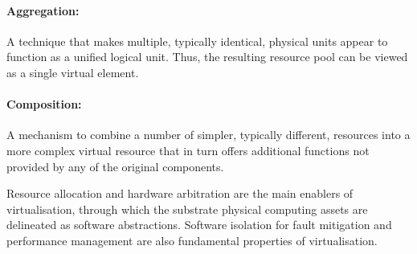 \paragraph{Aggregation:} A technique that makes multiple, typically identical, physical units appear to function as a unified logical unit. Thus, the resulting resource pool can be viewed as a single virtual element.

\paragraph{Composition:} A mechanism to combine a number of simpler, typically different, resources into a more complex virtual resource that in turn offers additional functions not provided by any of the original components. 

Resource allocation and hardware arbitration are the main enablers of virtualisation, through which the substrate physical computing assets are delineated as software abstractions.  Software isolation for fault mitigation and performance management are also fundamental properties of virtualisation.

